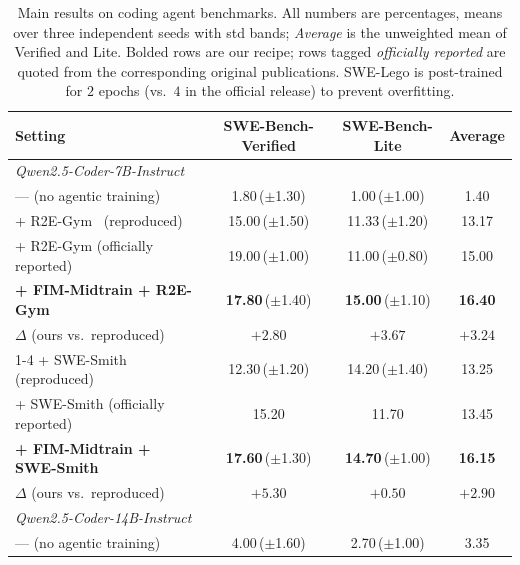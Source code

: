 \begin{table}[t]
\centering
\caption{Main results on coding agent benchmarks. All numbers are
percentages, means over three independent seeds with std bands;
\emph{Average} is the unweighted mean of Verified and Lite. Bolded rows
are our recipe; rows tagged \emph{officially reported} are quoted from
the corresponding original publications. SWE-Lego is post-trained for
$2$ epochs (vs.\ $4$ in the official release) to prevent overfitting.}
\label{tab:main}
\setlength{\tabcolsep}{6pt}
\begin{tabular}{lccc}
\toprule
Setting & SWE-Bench-Verified & SWE-Bench-Lite & Average \\
\midrule
\multicolumn{4}{l}{\textit{Qwen2.5-Coder-7B-Instruct}} \\
\quad --- (no agentic training)                       & 1.80\,($\pm$1.30)            & 1.00\,($\pm$1.00)            & 1.40 \\
\quad + R2E-Gym~\citep{r2egym} (reproduced)           & 15.00\,($\pm$1.50)           & 11.33\,($\pm$1.20)           & 13.17 \\
\quad + R2E-Gym (officially reported)                 & 19.00\,($\pm$1.00)           & 11.00\,($\pm$0.80)           & 15.00 \\
\quad \textbf{+ FIM-Midtrain + R2E-Gym}               & \textbf{17.80}\,($\pm$1.40)  & \textbf{15.00}\,($\pm$1.10)  & \textbf{16.40} \\
\rowcolor{blue!8}
\quad\quad $\Delta$ (ours vs.\ reproduced)            & $+2.80$                      & $+3.67$                      & $+3.24$ \\
\cmidrule(lr){1-4}
\quad + SWE-Smith~\citep{swesmith} (reproduced)       & 12.30\,($\pm$1.20)           & 14.20\,($\pm$1.40)           & 13.25 \\
\quad + SWE-Smith (officially reported)               & 15.20                        & 11.70                        & 13.45 \\
\quad \textbf{+ FIM-Midtrain + SWE-Smith}             & \textbf{17.60}\,($\pm$1.30)  & \textbf{14.70}\,($\pm$1.00)  & \textbf{16.15} \\
\rowcolor{blue!8}
\quad\quad $\Delta$ (ours vs.\ reproduced)            & $+5.30$                      & $+0.50$                      & $+2.90$ \\
\midrule
\multicolumn{4}{l}{\textit{Qwen2.5-Coder-14B-Instruct}} \\
\quad --- (no agentic training)                       & 4.00\,($\pm$1.60)            & 2.70\,($\pm$1.00)            & 3.35 \\

\end{tabular}
\end{table}
